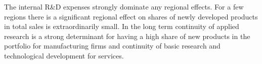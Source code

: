 \label{sec:conclusion}
The internal R\&D expenses strongly dominate any regional effects. For a few regions there is a significant regional effect on shares of newly developed products in total sales is extraordinarily small. In the long term continuity of applied research is a strong determinant for having a high share of new products in the portfolio for manufacturing firms and continuity of basic research and technological development for services.
